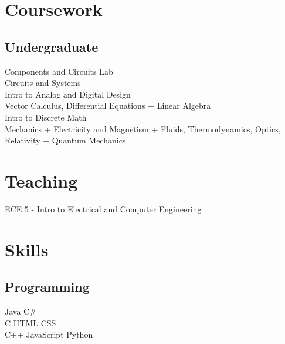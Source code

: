 \documentclass[]{deedy-resume-openfont}
\begin{document}
\begin{minipage}[t]{0.31\textwidth}


\section{Coursework}

\subsection{Undergraduate}
\textbullet Components and Circuits Lab \\
\textbullet Circuits and Systems \\
\textbullet Intro to Analog and Digital Design \\
\textbullet Vector Calculus, Differential Equations + Linear Algebra \\
\textbullet Intro to Discrete Math \\
\textbullet Mechanics + Electricity and Magnetism + Fluids, Thermodynamics, Optics, Relativity + Quantum Mechanics \\
\sectionsep


\section{Teaching}
ECE 5 - Intro to Electrical and Computer Engineering
\sectionsep


\section{Skills}
\subsection{Programming}
Java \textbullet{} C\# \\
C \textbullet{} HTML \textbullet{} CSS \\
C++ \textbullet{} JavaScript \textbullet{} Python \\
\sectionsep

\end{minipage}
\end{document}

